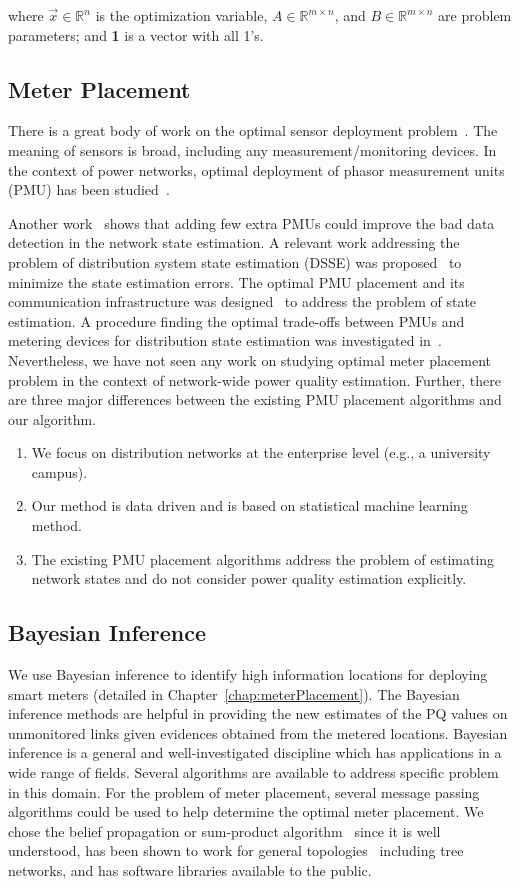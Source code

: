 where $\vec{x}\in \mathbb{R}^n$ is the optimization variable, $A \in \mathbb{R}^{m \times n}$, and $B \in \mathbb{R}^{m \times n}$ are problem parameters;  and \textbf{1} is a vector with all 1's.

\subsection{Meter Placement}
There is a great body of work on the optimal sensor deployment problem~\cite{Krause09}. The meaning of sensors is broad, including any measurement/monitoring devices. In the context of power networks, optimal deployment of phasor measurement units (PMU) has been studied~\cite{Yuill11}. 


Another work~\cite{chen2006placement} shows that adding few extra PMUs could improve the bad data detection in the network state estimation. A relevant work addressing the problem of distribution system state estimation (DSSE) was proposed~\cite{singh2011meter} to minimize the state estimation errors. The optimal PMU placement and its communication infrastructure was designed~\cite{shahraeini2012co} to address the problem of state estimation. A procedure finding the optimal trade-offs between PMUs and metering devices for distribution state estimation was investigated in~\cite{liu2012trade}. Nevertheless, we have not seen any work on studying optimal meter placement problem in the context of network-wide power quality estimation. Further, there are three major differences between the existing PMU placement algorithms and our algorithm.
\begin{enumerate}
\item We focus on distribution networks at the enterprise level (e.g., a university campus).
\item Our method is data driven and is based on statistical machine learning method.
\item The existing PMU placement algorithms address the problem of estimating network states and do not consider power quality estimation explicitly.
\end{enumerate}

\subsection{Bayesian Inference}
We use Bayesian inference to identify high information locations for deploying smart meters (detailed in Chapter~\ref{chap:meterPlacement}). The Bayesian inference methods are helpful in providing the new estimates of the PQ values on unmonitored links given evidences obtained from the metered locations. Bayesian inference is a general and well-investigated discipline which has applications in a wide range of fields. Several algorithms are available to address specific problem in this domain. For the problem of meter placement, several message passing algorithms could be used to
help determine the optimal meter placement. We chose the belief propagation or sum-product algorithm~\cite{pearl1988probabilistic} since it is well understood, has been shown to work for general topologies~\cite{yedidia2001generalized} including tree networks, and has software libraries available to the public.